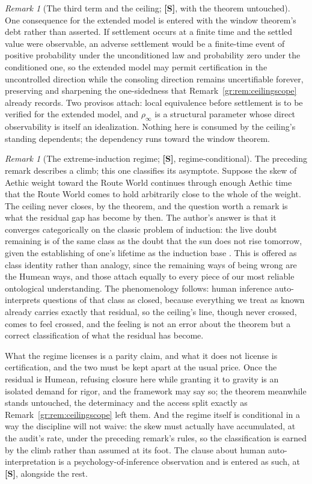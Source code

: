 \documentclass[11pt]{article}
\numberwithin{equation}{section}
\theoremstyle{plain}
\theoremstyle{definition}
\theoremstyle{remark}
\newtheorem{remark}[theorem]{Remark}
\begin{document}
\begin{remark}[The third term and the ceiling; \textbf{[S]}, with the
theorem untouched]
One consequence for the extended model is entered with the window
theorem's debt rather than asserted. If settlement occurs at a
finite time and the settled value were observable, an adverse
settlement would be a finite-time event of positive probability
under the unconditioned law and probability zero under the
conditioned one, so the extended model may permit certification in
the uncontrolled direction while the consoling direction remains
uncertifiable forever, preserving and sharpening the one-sidedness
that Remark~\ref{gr:rem:ceilingscope} already records. Two provisos
attach: local equivalence before settlement is to be verified for
the extended model, and $\rho_\infty$ is a structural parameter
whose direct observability is itself an idealization. Nothing here
is consumed by the ceiling's standing dependents; the dependency
runs toward the window theorem.
\end{remark}

\begin{remark}[The extreme-induction regime; \textbf{[S]}, regime-conditional]\label{sch:rem:inductionregime}
The preceding remark describes a climb; this one classifies its
asymptote. Suppose the skew of Aethic weight toward the Route World
continues through enough Aethic time that the Route World comes to
hold arbitrarily close to the whole of the weight. The ceiling never
closes, by the theorem, and the question worth a remark is what the
residual gap has become by then. The author's answer is that it
converges categorically on the classic problem of induction: the
live doubt remaining is of the same class as the doubt that the sun
does not rise tomorrow, given the establishing of one's lifetime as
the induction base \cite{Hume1748}. This is offered as class
identity rather than analogy, since the remaining ways of being
wrong are the Humean ways, and those attach equally to every piece
of our most reliable ontological understanding. The phenomenology
follows: human inference auto-interprets questions of that class as
closed, because everything we treat as known already carries exactly
that residual, so the ceiling's line, though never crossed, comes to
feel crossed, and the feeling is not an error about the theorem but
a correct classification of what the residual has become.

What the regime licenses is a parity claim, and what it does not
license is certification, and the two must be kept apart at the
usual price. Once the residual is Humean, refusing closure here
while granting it to gravity is an isolated demand for rigor, and
the framework may say so; the theorem meanwhile stands untouched,
the determinacy and the access split exactly as
Remark~\ref{gr:rem:ceilingscope} left them. And the regime itself is
conditional in a way the discipline will not waive: the skew must
actually have accumulated, at the audit's rate, under the preceding
remark's rules, so the classification is earned by the climb rather
than assumed at its foot. The clause about human auto-interpretation
is a psychology-of-inference observation and is entered as such, at
\textbf{[S]}, alongside the rest.
\end{remark}
\end{document}
